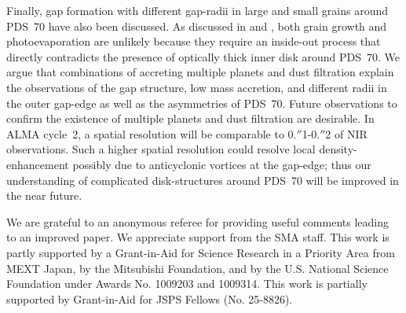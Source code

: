 \documentclass[apj]{emulateapj-rtx4}
\begin{document}
  Finally, gap formation with different gap-radii in large and small grains around PDS~70 have also been discussed. As discussed in
  \citet{hash12} and \citet{dong12b}, 
  both grain growth and photoevaporation are unlikely because they require an inside-out process
  that directly contradicts the presence of optically thick inner disk around PDS~70.
  We argue that
  combinations of accreting multiple planets and dust filtration explain the observations of 
  the gap structure, low mass accretion, and different radii in the outer gap-edge as well as 
  the asymmetries of PDS~70. Future observations to confirm the existence of multiple planets and dust filtration are desirable.
  In ALMA cycle~2, a spatial resolution will be comparable to 0.$''$1-0.$''$2 of NIR observations.
  Such a higher spatial resolution could resolve local density-enhancement possibly due to anticyclonic vortices at the gap-edge;
  thus our understanding of complicated disk-structures around PDS~70 will be improved in the near future.

  \bigskip  

  We are grateful to an anonymous referee for providing
  useful comments leading to an improved paper.
  We appreciate support from the SMA staff.
  This work is partly supported by a Grant-in-Aid for Science Research in
  a Priority Area from MEXT Japan, by the Mitsubishi Foundation, 
  and by the U.S. National Science Foundation under Awards No. 1009203 and 1009314.
  This work is partially supported by Grant-in-Aid for JSPS Fellows (No. 25-8826).
\end{document}
